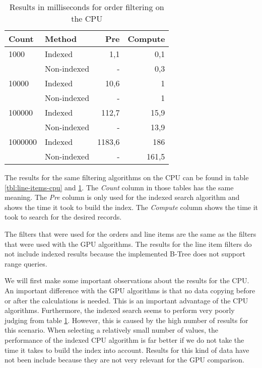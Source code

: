 \documentclass[a4paper,titlepage]{article}
\begin{document}
\begin{table}
\begin{tabular}{l l r r}
\toprule
\textbf{Count} & \textbf{Method} & \textbf{Pre} & \textbf{Compute}\\
\midrule
1000    & Indexed     & 1,1    & 0,1 \\
        & Non-indexed & -      & 0,3\\
10000   & Indexed     & 10,6   & 1 \\
        & Non-indexed & -      & 1 \\
100000  & Indexed     & 112,7  & 15,9 \\
        & Non-indexed & -      & 13,9 \\
1000000 & Indexed     & 1183,6 & 186 \\
        & Non-indexed & -      & 161,5 \\
\bottomrule
\end{tabular}
\label{tbl:orders-cpu}
\caption{Results in milliseconds for order filtering on the CPU}
\end{table}

The results for the same filtering algorithms on the CPU can be found in table \ref{tbl:line-items-cpu} and \ref{tbl:orders-cpu}. The \emph{Count} column in those tables has the same meaning. The \emph{Pre} column is only used for the indexed search algorithm and shows the time it took to build the index. The \emph{Compute} column shows the time it took to search for the desired records.

The filters that were used for the orders and line items are the same as the filters that were used with the GPU algorithms. The results for the line item filters do not include indexed results because the implemented B-Tree does not support range queries. 

We will first make some important observations about the results for the CPU. An important difference with the GPU algorithms is that no data copying before or after the calculations is needed. This is an important advantage of the CPU algorithms. Furthermore, the indexed search seems to perform very poorly judging from table \ref{tbl:orders-cpu}. However, this is caused by the high number of results for this scenario. When selecting a relatively small number of values, the performance of the indexed CPU algorithm is far better if we do not take the time it takes to build the index into account. Results for this kind of data have not been include because they are not very relevant for the GPU comparison.
\end{document}
